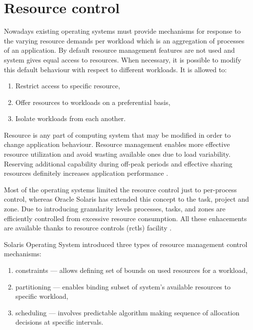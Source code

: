 \documentclass[11pt,openany]{book}
\begin{document}
    \section{Resource control}
    \label{sec:sol:res}

      Nowadays existing operating systems must provide mechanisms for response to the varying resource demands per
      workload which is an aggregation of processes of an application. By default resource management features are not
      used and system gives equal access to resources. When necessary, it is possible to modify this default behaviour
      with respect to different workloads. It is allowed to:

      \begin{enumerate}
        \item Restrict access to specific resource,
        \item Offer resources to workloads on a preferential basis,
        \item Isolate workloads from each another.
      \end{enumerate}
	
      Resource is any part of computing system that may be modified in order to change application behaviour. Resource
      management enables more effective resource utilization and avoid wasting available ones due to load variability.
      Reserving additional capability during off-peak periods and effective sharing resources definitely increases
      application performance \cite{oracle_admin_guide}.

      Most of the operating systems limited the resource control just to per-process control, whereas Oracle Solaris has
      extended this concept to the task, project and zone. Due to introducing granularity levels processes, tasks, and 
      zones are efficiently controlled from excessive resource consumption. All these enhacements are available thanks 
      to resource controls (rctls) facility \cite{oracle_admin_guide}.
      
      Solaris Operating System introduced three types of resource management control mechanisms:

      \begin{enumerate}
        \item constraints --- allows defining set of bounds on used resources for a workload,
        \item partitioning --- enables binding subset of system's available resources to specific workload,
        \item scheduling --- involves predictable algorithm making sequence of allocation decisions at specific
                             intervals.
      \end{enumerate}
\end{document}
